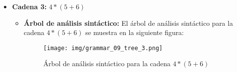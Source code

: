 \documentclass[11pt]{report}
\begin{document}
\begin{itemize}
\begin{itemize}
    \newpage

    \item \textbf{Cadena 3:} $4*(5+6)$
    \begin{itemize}
      \item \textbf{Árbol de análisis sintáctico:} El árbol de análisis sintáctico para la cadena $4*(5+6)$ se muestra en la siguiente figura:
      \begin{figure}[H]
        \centering
        \texttt{[image: img/grammar\_09\_tree\_3.png]}
        \caption{Árbol de análisis sintáctico para la cadena $4*(5+6)$}
        \label{fig:arbol27}
      \end{figure}
    \end{itemize}
  \end{itemize}
\end{itemize}

\newpage
\end{document}
